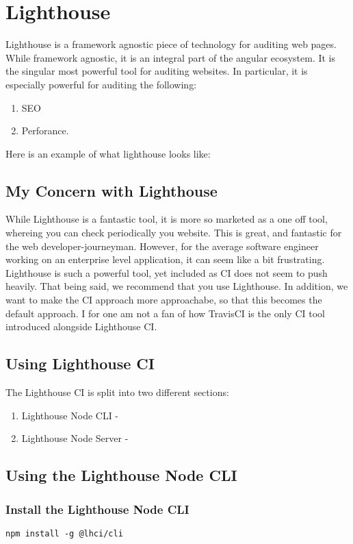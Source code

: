 \chapter{ Lighthouse }    

Lighthouse is a framework agnostic piece of technology for auditing web pages. While framework agnostic, it is an integral part of the angular ecosystem. It is the singular most powerful tool for auditing websites. In particular, it is especially powerful for auditing the following:
\begin{enumerate}
  \item SEO 
  \item Perforance.
\end{enumerate}

Here is an example of what lighthouse looks like: 

\section{My Concern with Lighthouse}
While Lighthouse is a fantastic tool, it is more so marketed as a one off tool, whereing you can check periodically you website. This is great, and fantastic for the web developer-journeyman. However, for the average software engineer working on an enterprise level application, it can seem like a bit frustrating. Lighthouse is such a powerful tool, yet included as CI does not seem to push heavily. That being said, we recommend that you use Lighthouse. In addition, we want to make the CI approach more approachabe, so that this becomes the default approach. I for one am not a fan of how TravisCI is the only CI tool introduced alongside Lighthouse CI.

\section{Using Lighthouse CI}
The Lighthouse CI is split into two different sections: 
\begin{enumerate}
  \item Lighthouse Node CLI - 
  \item Lighthouse Node Server - 
\end{enumerate}

\section{Using the Lighthouse Node CLI}
\subsection{Install the Lighthouse Node CLI}
\begin{verbatim}
npm install -g @lhci/cli
\end{verbatim}

